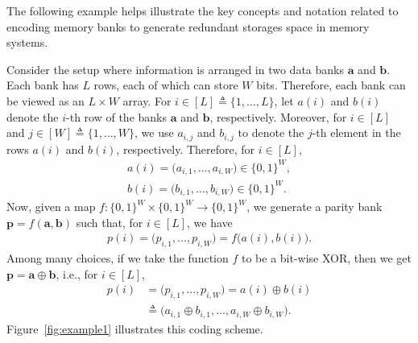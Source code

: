 The following example helps illustrate the key concepts and notation related to encoding memory banks to generate redundant storages space in memory systems. 

 \begin{example}
Consider the setup where information is arranged in two data banks $\mathbf{a}$ and $\mathbf{b}$. Each bank has $L$ rows, each of which can store $W$ bits. Therefore, each bank can be viewed as an $L \times W$ array. For $i \in [L] \triangleq \{1,\ldots, L\}$, let $a(i)$ and $b(i)$ denote the $i$-th row of the banks $\mathbf{a}$ and $\mathbf{b}$, respectively. Moreover, for $i \in [L]$ and $j \in [W] \triangleq \{1,\ldots, W\}$, we use $a_{i, j}$ and $b_{i, j}$ to denote the $j$-th element in the rows $a(i)$ and $b(i)$, respectively. Therefore, for $i \in [L]$,
\begin{align}
a(i) = \big(a_{i,1}, \ldots, a_{i, W}\big) \in \{0, 1\}^W,\nonumber \\
b(i) = \big(b_{i,1}, \ldots, b_{i, W}\big) \in \{0, 1\}^W. \nonumber
\end{align}
Now, given a map $f: \{0, 1\}^W \times \{0, 1\}^W \to \{0, 1\}^W$, we generate a parity bank $\mathbf{p} = f(\mathbf{a}, \mathbf{b})$ such that, for $i \in [L]$, we have
\begin{align}
p(i) = \big(p_{i, 1},\ldots, p_{i,W}\big) = f\big(a(i), b(i)\big).
\end{align}
Among many choices, if we take the function $f$ to be a bit-wise XOR, then we get $\mathbf{p} = \mathbf{a} \oplus \mathbf{b}$, i.e., for $i \in [L]$, 
\begin{align}
p(i) &= \big(p_{i, 1},\ldots, p_{i,W}\big) = a(i) \oplus b(i)\nonumber \\
&\triangleq \big(a_{i,1}\oplus b_{i,1},\ldots, a_{i,W}\oplus b_{i,W}\big). 
\end{align}
Figure~\ref{fig:example1} illustrates this coding scheme. 
\end{example}

